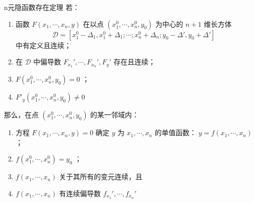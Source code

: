 \begin{theorem}{n元隐函数存在定理}\label{the_Mulmp_1}
若：\begin{enumerate}
\item 函数 $F(x_1,\cdots,x_n,y)$ 在以点 $(x_1^0,\cdots,x_n^0,y_0)$ 为中心的 $n+1$ 维长方体
\begin{equation}
\mathcal{D}=[x_1^0-\Delta_1,x_1^0+\Delta_1;\cdots;x_n^0+\Delta_n;y_0-\Delta',y_0+\Delta']~
\end{equation}
中有定义且连续；
\item 在 $\mathcal{D}$ 中偏导数 $F_{x_1}',\cdots,F_{x_n}',F_y'$ 存在且连续；
\item $F(x_1^0,\cdots,x_n^0,y_0)=0$ ；
\item $F'_y(x_1^0,\cdots,x_n^0,y_0)\neq 0$
\end{enumerate}
那么，在点 $(x_1^0,\cdots,x_n^0,y_0)$ 的某一邻域内：
\begin{enumerate}
\item 方程 $F(x_1,\cdots,x_n,y)=0$ 确定 $y$ 为 $x_1,\cdots,x_n$ 的单值函数： $y=f(x_1,\cdots,x_n)$；
\item $f(x_1^0,\cdots,x_n^0)=y_0$ ；
\item $f(x_1,\cdots,x_n)$ 关于其所有的变元连续，且
\item $f(x_1,\cdots,x_n)$ 有连续偏导数 $f_{x_1}',\cdots,f_{x_n}'$
\end{enumerate}
\end{theorem}

